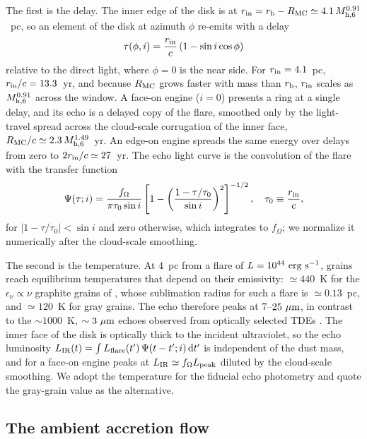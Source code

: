 \documentclass[twocolumn,pdftex]{aastex701}
\newcommand{\mhsix}{M_{\rm h,6}\xspace}
\newcommand{\fom}{f_{\Omega}\xspace}
\newcommand{\rb}{r_{\rm b}\xspace}
\newcommand{\um}{\mu{\rm m}\xspace}
\begin{document}
The first is the delay. The inner edge of the disk is at $r_{\rm in} = \rb - R_{\rm MC} \simeq 4.1\, \mhsix^{0.91}$~pc, so an element of the disk at azimuth $\phi$ re-emits with a delay
\begin{equation}
\tau(\phi, i) = \frac{r_{\rm in}}{c}\left(1 - \sin i \cos\phi\right)
\end{equation}
relative to the direct light, where $\phi = 0$ is the near side. For $r_{\rm in} = 4.1$~pc, $r_{\rm in}/c = 13.3$~yr, and because $R_{\rm MC}$ grows faster with mass than $\rb$, $r_{\rm in}$ scales as $\mhsix^{0.91}$ across the window. A face-on engine ($i = 0$) presents a ring at a single delay, and its echo is a delayed copy of the flare, smoothed only by the light-travel spread across the cloud-scale corrugation of the inner face, $R_{\rm MC}/c \simeq 2.3\, \mhsix^{1.49}$~yr. An edge-on engine spreads the same energy over delays from zero to $2 r_{\rm in}/c \simeq 27$~yr. The echo light curve is the convolution of the flare with the transfer function
\begin{equation}
\Psi(\tau; i) = \frac{\fom}{\pi \tau_{0} \sin i}\left[1 - \left(\frac{1 - \tau/\tau_{0}}{\sin i}\right)^{2}\right]^{-1/2},
\quad \tau_{0} \equiv \frac{r_{\rm in}}{c},
\label{eq:transfer}
\end{equation}
for $|1 - \tau/\tau_{0}| < \sin i$ and zero otherwise, which integrates to $\fom$; we normalize it numerically after the cloud-scale smoothing.

The second is the temperature. At $4$~pc from a flare of $L = 10^{44}~{\rm erg~s^{-1}}$, grains reach equilibrium temperatures that depend on their emissivity: $\simeq 440$~K for the $\epsilon_\nu \propto \nu$ graphite grains of \citet{Barvainis:1987a}, whose sublimation radius for such a flare is $\simeq 0.13$~pc, and $\simeq 120$~K for gray grains. The echo therefore peaks at $7$--$25~\um$, in contrast to the $\sim 1000$~K, $\sim 3~\um$ echoes observed from optically selected TDEs \citep{vanVelzen:2016a,Jiang:2016a}. The inner face of the disk is optically thick to the incident ultraviolet, so the echo luminosity $L_{\rm IR}(t) = \int L_{\rm flare}(t')\, \Psi(t - t'; i)\, {\rm d}t'$ is independent of the dust mass, and for a face-on engine peaks at $L_{\rm IR} \simeq \fom L_{\rm peak}$ diluted by the cloud-scale smoothing. We adopt the \citet{Barvainis:1987a} temperature for the fiducial echo photometry and quote the gray-grain value as the alternative.

\subsection{The ambient accretion flow}\label{subsec:agn}
\end{document}
